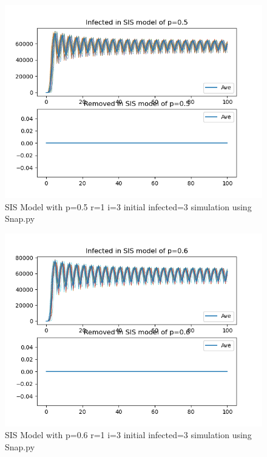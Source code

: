 \documentclass{subfile}
\begin{document}
  \begin{figure}
  \includegraphics[scale=0.8]{sisp05r1i3s3}
  \caption[SIS p=0.5,r=1,i=3,init infected=3]{SIS Model with p=0.5 r=1 i=3 initial infected=3 simulation using Snap.py}
  \end{figure}
  \begin{figure}
  \includegraphics[scale=0.8]{sisp06r1i3s3}
  \caption[SIS p=0.6,r=1,i=3,init infected=3]{SIS Model with p=0.6 r=1 i=3 initial infected=3 simulation using Snap.py}
  \end{figure}
\end{document}

